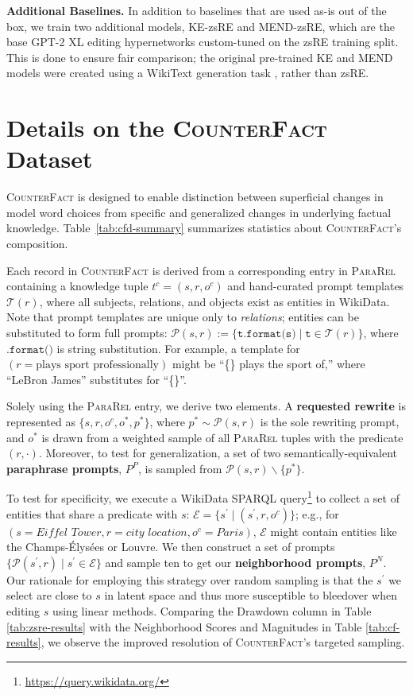 \documentclass{article}
\newcommand{\cfd}{\textsc{CounterFact}\xspace}
\newcommand{\pararel}{\textsc{ParaRel}\xspace}
\begin{document}
\begin{appendices}
\textbf{Additional Baselines.} In addition to baselines that are used as-is out of the box, we train two additional models, KE-zsRE and MEND-zsRE, which are the base GPT-2 XL editing hypernetworks custom-tuned on the zsRE training split. This is done to ensure fair comparison; the original pre-trained KE and MEND models were created using a WikiText generation task \citep{decao-ke, mend}, rather than zsRE.

\section{Details on the \cfd Dataset} \label{apd:counterfact}


\cfd is designed to enable distinction between superficial changes in model word choices from specific and generalized changes in underlying factual knowledge. Table~\ref{tab:cfd-summary} summarizes statistics about \cfd's composition.

Each record in \cfd is derived from a corresponding entry in \pararel \citep{10.1162/tacl_a_00410} containing a knowledge tuple $t^c = (s,r,o^c)$ and hand-curated prompt templates $\mathcal{T}(r)$, where all subjects, relations, and objects exist as entities in WikiData. Note that prompt templates are unique only to \textit{relations}; entities can be substituted to form full prompts: $\mathcal{P}(s,r) :=  \{ \texttt{t.format(s)} \mid \texttt{t} \in \mathcal{T}(r) \}$, where $\texttt{.format()}$ is string substitution. For example, a template for $(r=\text{plays sport professionally})$ might be ``\{\} plays the sport of,'' where ``LeBron James'' substitutes for ``\{\}''.

Solely using the \pararel entry, we derive two elements. A \textbf{requested rewrite} is represented as $\{s, r, o^c, o^*, p^* \}$, where $p^* \sim\mathcal{P}(s, r)$ is the sole rewriting prompt, and $o^*$ is drawn from a weighted sample of all \pararel tuples with the predicate $(r, \cdot)$.
Moreover, to test for generalization, a set of two semantically-equivalent \textbf{paraphrase prompts}, $P^P$, is sampled from $\mathcal{P}(s,r) \backslash \{p^*\}$.

To test for specificity, we execute a WikiData SPARQL query\footnote{\url{https://query.wikidata.org/}} to collect a set of entities that share a predicate with $s$: $\mathcal{E} =\{ s^\prime \mid (s^\prime, r, o^c) \}$; e.g., for $(s=\textit{Eiffel Tower}, r=\textit{city location}, o^c=\textit{Paris})$, $\mathcal{E}$ might contain entities like the Champs-Élysées or Louvre. We then construct a set of prompts $\{\mathcal{P}(s^\prime, r) \mid s^\prime \in \mathcal{E}\}$ and sample ten to get our \textbf{neighborhood prompts}, $P^N$. Our rationale for employing this strategy over random sampling is that the $s^\prime$ we select are close to $s$ in latent space and thus more susceptible to bleedover when editing $s$ using linear methods. Comparing the Drawdown column in Table \ref{tab:zsre-results} with the Neighborhood Scores and Magnitudes in Table \ref{tab:cf-results}, we observe the improved resolution of \cfd's targeted sampling.



\end{appendices}
\end{document}
